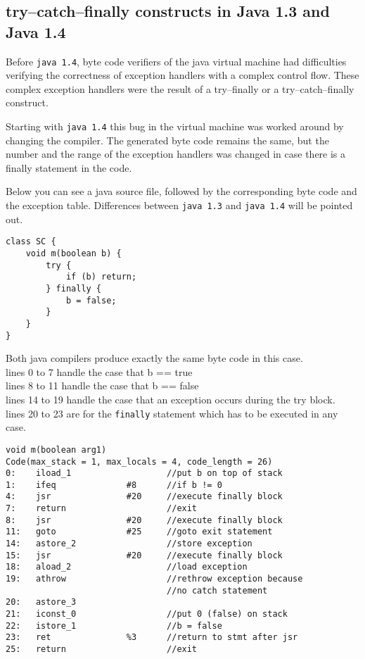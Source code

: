 \documentclass[11pt,twoside,a4paper,draft]{article}
\begin{document}
\subsection {try--catch--finally constructs in Java 1.3 and Java 1.4}

Before \texttt{java 1.4}, byte code verifiers of the java virtual machine had
difficulties verifying the correctness of exception handlers with a complex
control flow. These complex exception handlers were the result of a 
try--finally or a try--catch--finally construct.

Starting with \texttt{java 1.4} this bug in the virtual machine was worked 
around by changing the compiler. The generated byte code remains the same, but
the number and the range of the exception handlers was changed in case there 
is a finally statement in the code. 

Below you can see a java source file, followed by the corresponding byte code
and the exception table. Differences between \texttt{java 1.3} and 
\texttt{java 1.4} will be pointed out.

\begin{verbatim}
class SC {
    void m(boolean b) {
        try {
            if (b) return;
        } finally {
            b = false;
        }
    }
}
\end{verbatim}
Both java compilers produce exactly the same byte code in this case.
\\lines 0 to 7 handle the case that b == true
\\lines 8 to 11 handle the case that b == false
\\lines 14 to 19 handle the case that an exception occurs during the
try block.
\\lines 20 to 23 are for the \texttt{finally} statement which has to be 
executed in any case.

\begin{verbatim}
void m(boolean arg1)
Code(max_stack = 1, max_locals = 4, code_length = 26)
0:    iload_1                   //put b on top of stack
1:    ifeq              #8      //if b != 0
4:    jsr               #20     //execute finally block
7:    return                    //exit
8:    jsr               #20     //execute finally block
11:   goto              #25     //goto exit statement
14:   astore_2                  //store exception
15:   jsr               #20     //execute finally block
18:   aload_2                   //load exception
19:   athrow                    //rethrow exception because 
                                //no catch statement
20:   astore_3			
21:   iconst_0                  //put 0 (false) on stack
22:   istore_1                  //b = false
23:   ret               %3      //return to stmt after jsr
25:   return                    //exit

\end{verbatim}
\end{document}
